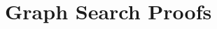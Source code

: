 \documentclass{report}
\newlength{\offsetpage}
\newenvironment{widepage}
   {\begin{adjustwidth}{-\offsetpage}{-\offsetpage}%
    \addtolength{\textwidth}{2\offsetpage}}%
{\end{adjustwidth}}
\begin{document}
%      
%      
%      
%      















{\small


}

\appendix
\chapter{Graph Search Proofs}
\label{appendix:gs-proofs}
\end{document}
